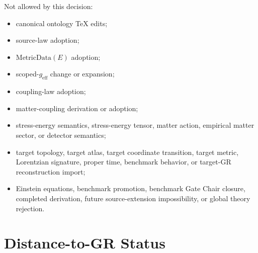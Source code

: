 \documentclass[11pt]{article}
\newcommand{\MetricData}{\mathrm{MetricData}}
\newcommand{\geff}{g_{\mathrm{eff}}}
\begin{document}
Not allowed by this decision:
\begin{itemize}[leftmargin=*]
  \item canonical ontology TeX edits;
  \item source-law adoption;
  \item \(\MetricData(E)\) adoption;
  \item scoped-\(\geff\) change or expansion;
  \item coupling-law adoption;
  \item matter-coupling derivation or adoption;
  \item stress-energy semantics, stress-energy tensor, matter action,
  empirical matter sector, or detector semantics;
  \item target topology, target atlas, target coordinate transition, target
  metric, Lorentzian signature, proper time, benchmark behavior, or target-GR
  reconstruction import;
  \item Einstein equations, benchmark promotion, benchmark Gate Chair closure,
  completed derivation, future source-extension impossibility, or global
  theory rejection.
\end{itemize}

\section{Distance-to-GR Status}
\end{document}
